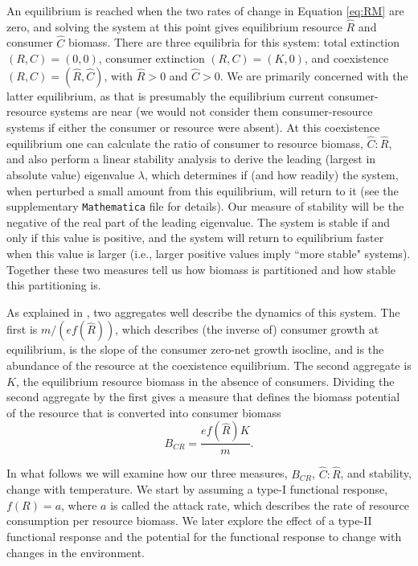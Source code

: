 \documentclass[11pt]{article}
\begin{document}
An equilibrium is reached when the two rates of change in Equation \eqref{eq:RM} are zero, and solving the system at this point gives equilibrium resource $\hat{R}$ and consumer $\hat{C}$ biomass.
There are three equilibria for this system: total extinction $(R,C) = (0,0)$, consumer extinction $(R,C)=(K,0)$, and coexistence $(R,C)=(\hat{R},\hat{C})$, with $\hat{R}>0$ and $\hat{C}>0$.
We are primarily concerned with the latter equilibrium, as that is presumably the equilibrium current consumer-resource systems are near (we would not consider them consumer-resource systems if either the consumer or resource were absent).
At this coexistence equilibrium one can calculate the ratio of consumer to resource biomass, $\hat{C}:\hat{R}$, and also perform a linear stability analysis to derive the leading (largest in absolute value) eigenvalue $\lambda$, which determines if (and how readily) the system, when perturbed a small amount from this equilibrium, will return to it (see the supplementary \texttt{Mathematica} file for details).
Our measure of stability will be the negative of the real part of the leading eigenvalue.
The system is stable if and only if this value is positive, and the system will return to equilibrium faster when this value is larger (i.e., larger positive values imply ``more stable" systems).
Together these two measures tell us how biomass is partitioned and how stable this partitioning is.

As explained in \cite{Gilbert2014}, two aggregates well describe the dynamics of this system.
The first is $m /(e f(\hat{R}))$, which describes (the inverse of) consumer growth at equilibrium, is the slope of the consumer zero-net growth isocline, and is the abundance of the resource at the coexistence equilibrium.
The second aggregate is $K$, the equilibrium resource biomass in the absence of consumers.
Dividing the second aggregate by the first gives a measure that defines the biomass potential of the resource that is converted into consumer biomass \[B_{CR} = \frac{e f(\hat{R}) K}{m}.\]

In what follows we will examine how our three measures, $B_{CR}$, $\hat{C}:\hat{R}$, and stability, change with temperature.
We start by assuming a type-I functional response, $f(R) = a$, where $a$ is called the attack rate, which describes the rate of resource consumption per resource biomass.
We later explore the effect of a type-II functional response and the potential for the functional response to change with changes in the environment.
\end{document}
